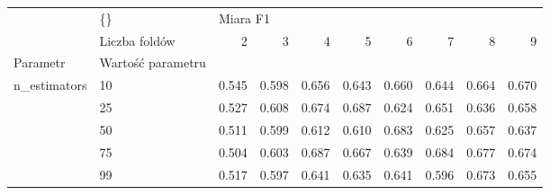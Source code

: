 \begin{tabular}{llrrrrrrrr}
\hline
             & \{\} & \multicolumn{8}{l}{Miara F1} \\
             & Liczba foldów &        2 &      3 &      4 &      5 &      6 &      7 &      8 &      9 \\
Parametr & Wartość parametru &          &        &        &        &        &        &        &        \\
\hline
n\_estimators & 10 &    0.545 &  0.598 &  0.656 &  0.643 &  0.660 &  0.644 &  0.664 &  0.670 \\
             & 25 &    0.527 &  0.608 &  0.674 &  0.687 &  0.624 &  0.651 &  0.636 &  0.658 \\
             & 50 &    0.511 &  0.599 &  0.612 &  0.610 &  0.683 &  0.625 &  0.657 &  0.637 \\
             & 75 &    0.504 &  0.603 &  0.687 &  0.667 &  0.639 &  0.684 &  0.677 &  0.674 \\
             & 99 &    0.517 &  0.597 &  0.641 &  0.635 &  0.641 &  0.596 &  0.673 &  0.655 \\
\hline
\end{tabular}
